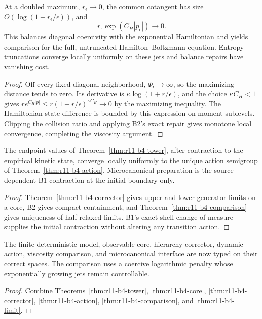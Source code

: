 \begin{theorem}
\label{thm:r11-b4-comparison}
At a doubled maximum, $r_\epsilon\to0$, the common cotangent has size
$O(\log(1+r_\epsilon/\epsilon))$, and
\[
 r_\epsilon\exp(C_H|p_\epsilon|)\longrightarrow0.
\]
This balances diagonal coercivity with the exponential Hamiltonian and yields
comparison for the full, untruncated Hamilton--Boltzmann equation.  Entropy
truncations converge locally uniformly on these jets and balance repairs have
vanishing cost.
\end{theorem}

\begin{proof}
Off every fixed diagonal neighborhood, $\Phi_\epsilon\to\infty$, so the
maximizing distance tends to zero.  Its derivative is
$\kappa\log(1+r/\epsilon)$, and the choice $\kappa C_H<1$ gives
$r e^{C_H|p|}\le r(1+r/\epsilon)^{\kappa C_H}\to0$ by the maximizing
inequality.  The Hamiltonian state difference is bounded by this expression
on moment sublevels.  Clipping the collision ratio and applying B2's exact
repair gives monotone local convergence, completing the viscosity argument.
\end{proof}

\begin{theorem}
\label{thm:r11-b4-limit}
The endpoint values of Theorem~\ref{thm:r11-b4-tower}, after contraction to
the empirical kinetic state, converge locally uniformly to the unique action
semigroup of Theorem~\ref{thm:r11-b4-action}.  Microcanonical preparation is
the source-dependent B1 contraction at the initial boundary only.
\end{theorem}

\begin{proof}
Theorem~\ref{thm:r11-b4-corrector} gives upper and lower generator limits on a
core, B2 gives compact containment, and
Theorem~\ref{thm:r11-b4-comparison} gives uniqueness of half-relaxed limits.
B1's exact shell change of measure supplies the initial contraction without
altering any transition action.
\end{proof}

\begin{theorem}
\label{thm:r11-b4-main}
The finite deterministic model, observable core, hierarchy corrector, dynamic
action, viscosity comparison, and microcanonical interface are now typed on
their correct spaces.  The comparison uses a coercive logarithmic penalty
whose exponentially growing jets remain controllable.
\end{theorem}

\begin{proof}
Combine Theorems~\ref{thm:r11-b4-tower},
\ref{thm:r11-b4-core}, \ref{thm:r11-b4-corrector},
\ref{thm:r11-b4-action}, \ref{thm:r11-b4-comparison}, and
\ref{thm:r11-b4-limit}.
\end{proof}
